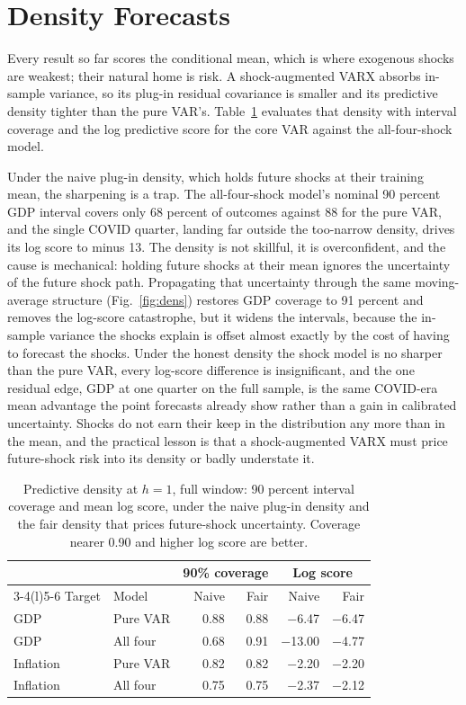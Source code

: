 \documentclass[conference]{IEEEtran}
\begin{document}
\section{Density Forecasts}
Every result so far scores the conditional mean, which is where exogenous shocks are weakest; their natural home is risk. A shock-augmented VARX absorbs in-sample variance, so its plug-in residual covariance is smaller and its predictive density tighter than the pure VAR's. Table~\ref{tab:dens} evaluates that density with interval coverage and the log predictive score for the core VAR against the all-four-shock model.

Under the naive plug-in density, which holds future shocks at their training mean, the sharpening is a trap. The all-four-shock model's nominal 90 percent GDP interval covers only 68 percent of outcomes against 88 for the pure VAR, and the single COVID quarter, landing far outside the too-narrow density, drives its log score to minus 13. The density is not skillful, it is overconfident, and the cause is mechanical: holding future shocks at their mean ignores the uncertainty of the future shock path. Propagating that uncertainty through the same moving-average structure (Fig.~\ref{fig:dens}) restores GDP coverage to 91 percent and removes the log-score catastrophe, but it widens the intervals, because the in-sample variance the shocks explain is offset almost exactly by the cost of having to forecast the shocks. Under the honest density the shock model is no sharper than the pure VAR, every log-score difference is insignificant, and the one residual edge, GDP at one quarter on the full sample, is the same COVID-era mean advantage the point forecasts already show rather than a gain in calibrated uncertainty. Shocks do not earn their keep in the distribution any more than in the mean, and the practical lesson is that a shock-augmented VARX must price future-shock risk into its density or badly understate it.

\begin{table}[t]
\caption{Predictive density at $h=1$, full window: 90 percent interval coverage and mean log score, under the naive plug-in density and the fair density that prices future-shock uncertainty. Coverage nearer 0.90 and higher log score are better.}
\label{tab:dens}
\centering
\small
\setlength{\tabcolsep}{4pt}
\begin{tabular}{@{}llrrrr@{}}
\toprule
& & \multicolumn{2}{c}{90\% coverage} & \multicolumn{2}{c}{Log score} \\
\cmidrule(l){3-4}\cmidrule(l){5-6}
Target & Model & Naive & Fair & Naive & Fair \\
\midrule
GDP & Pure VAR & 0.88 & 0.88 & $-$6.47 & $-$6.47 \\
GDP & All four & 0.68 & 0.91 & $-$13.00 & $-$4.77 \\
Inflation & Pure VAR & 0.82 & 0.82 & $-$2.20 & $-$2.20 \\
Inflation & All four & 0.75 & 0.75 & $-$2.37 & $-$2.12 \\
\bottomrule
\end{tabular}
\end{table}
\end{document}
